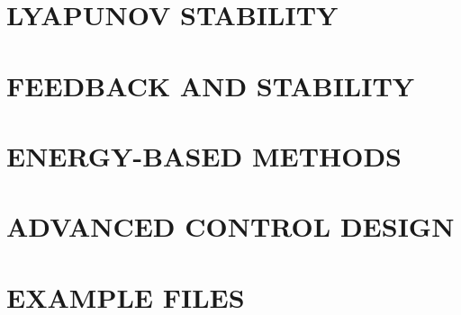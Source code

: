\documentclass[
	11pt, %
	fleqn, %
	a4paper, %
]{LegrandOrangeBook}
\begin{document}
\part{LYAPUNOV STABILITY}



\part{FEEDBACK AND STABILITY}




\part{ENERGY-BASED METHODS}
 


\part{ADVANCED CONTROL DESIGN}

\part{EXAMPLE FILES}





\stopcontents[part] %




\end{document}

